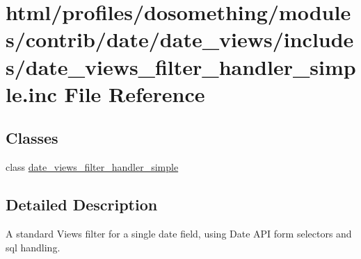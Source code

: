 \hypertarget{date__views__filter__handler__simple_8inc}{
\section{html/profiles/dosomething/modules/contrib/date/date\_\-views/includes/date\_\-views\_\-filter\_\-handler\_\-simple.inc File Reference}
\label{date__views__filter__handler__simple_8inc}
}
\subsection*{Classes}
\begin{DoxyCompactItemize}
\item 
class \hyperlink{classdate__views__filter__handler__simple}{date\_\-views\_\-filter\_\-handler\_\-simple}
\end{DoxyCompactItemize}


\subsection{Detailed Description}
A standard Views filter for a single date field, using Date API form selectors and sql handling. 